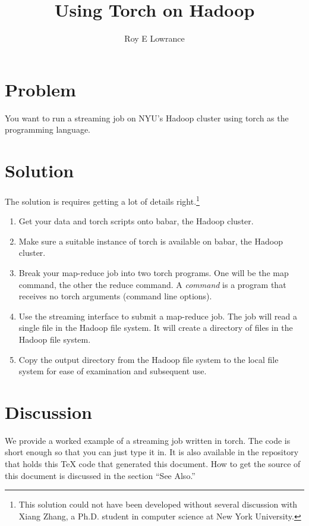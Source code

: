 \documentclass{article}
\begin{document}
\title{Using Torch on Hadoop}
\author{Roy E Lowrance}
\maketitle


\section{Problem}

You want to run a streaming job on NYU's Hadoop cluster using torch as
the programming language.

\section{Solution}

The solution is requires getting a lot of details right.\footnote{This
  solution could not have been developed without several discussion with
  Xiang Zhang, a Ph.D. student in computer science at New York
University.}

\begin{enumerate}
  \item Get your data and torch scripts onto babar, the Hadoop cluster.
  \item Make sure a suitable instance of torch is available on babar,
    the Hadoop cluster.
  \item Break your map-reduce job into two torch programs. One will be
    the map command, the other the reduce command. A \emph{command} is a
    program that receives no torch arguments (command line
    options). 
  \item Use the streaming interface to submit a map-reduce job. The job
    will read a single file in the Hadoop file system. It will create a
    directory of files in the Hadoop file system.
  \item Copy the output directory from the Hadoop file system to the
    local file system for ease of examination and subsequent use.
\end{enumerate}

\section{Discussion}

We provide a worked example of a streaming job written in torch. The
code is short enough so that you can just type it in. It is also
available in the repository that holds this TeX code that generated this
document. How to get the source of this document is discussed in the
section ``See Also.''
\end{document}
